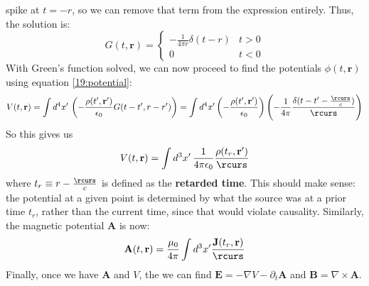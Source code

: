 spike at \( t = -r \), so we can remove that term from the expression entirely. Thus, the solution is:
\[
	G(t, \mathbf{r}) = \begin{cases}
		-\frac{1}{4\pi r}\delta(t - r) & t > 0\\
		0 & t < 0
	\end{cases}
\]
With Green's function solved, we can now proceed to find the potentials \( \phi(t, \mathbf{r}) \) using
equation \ref{19:potential}:
\[
	V(t, \mathbf{r}) = \int d^{4}x' \, \left( -\frac{\rho(t', \mathbf{r}')}{\epsilon_0}G(t - t', r - r')
	\right) = \int d^{4}x' \left( -\frac{\rho(t', \mathbf{r}')}{\epsilon_0} \right)\left(
	-\frac{1}{4\pi}\frac{\delta(t - t' - \frac{\rcurs}{c})}{\rcurs} \right)
\]
So this gives us
\begin{equation}
	\label{22:V}
	V(t, \mathbf{r}) = \int d^3x' \, \frac{1}{4\pi \epsilon_0}\frac{\rho(t_r, \mathbf{r}')}{\rcurs}
\end{equation}
where \( t_r \equiv r - \frac{\rcurs}{c} \) is defined as the \textbf{retarded time}. This should make sense:
the potential at a given point is determined by what the source was at a prior time \( t_r \), rather than
the current time, since that would violate causality. Similarly, the magnetic potential \( \mathbf{A} \) is
now:
\begin{equation}
	\label{22:A}
	\mathbf{A}(t, \mathbf{r}) = \frac{\mu_0}{4\pi}\int d^3 x' \frac{\mathbf{J}(t_r, \mathbf{r})}{\rcurs}
\end{equation}
Finally, once we have \( \mathbf{A} \) and \( V \), the we can find \( \mathbf{E} = -\nabla V - \partial_t
\mathbf{A} \) and \( \mathbf{B} = \nabla \times \mathbf{A} \). 
 
